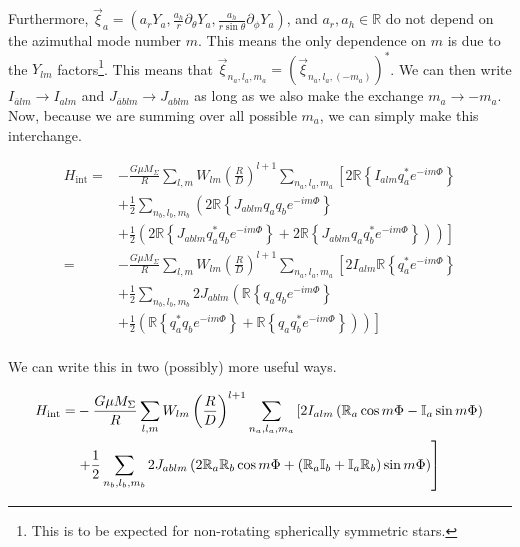 Furthermore, $\vec{\xi}_a = \left( a_r Y_a, \frac{a_h}{r} \partial_{\theta} Y_a, \frac{a_h}{r \sin\theta} \partial_{\phi} Y_a \right)$, and $a_r, a_h \in \mathbb{R}$ do not depend on the azimuthal mode number $m$. This means the only dependence on $m$ is due to the $Y_{lm}$ factors\footnote{This is to be expected for non-rotating spherically symmetric stars.}. This means that $\vec{\xi}_{n_a,l_a,m_a} = \left(\vec{\xi}_{n_a,l_a,(-m_a)}\right)^\ast$. We can then write $I_{\bar{a}lm} \rightarrow I_{alm}$ and $J_{\bar{a}blm} \rightarrow J_{ablm}$ as long as we also make the exchange $m_a \rightarrow -m_a$. Now, because we are summing over all possible $m_a$, we can simply make this interchange.

\begin{subequations}
\begin{align}
H_{\mathrm{int}}  = & - \frac{G \mu M_{\Sigma}}{R} \sum_{l,m} W_{lm} \left(\frac{R}{D}\right)^{l+1} \sum_{n_a, l_a, m_a} \left[ 2\mathbb{R}\left\{I_{alm}q_a^\ast e^{-i m \Phi}\right\} \right. \\
                    & \left. + \frac{1}{2}\sum_{n_b,l_b,m_b} \left( 2\mathbb{R}\left\{J_{ablm}q_a q_b e^{-i m \Phi}\right\} \right. \right.\\
                    & \left. \left. + \frac{1}{2}\left( 2\mathbb{R}\left\{J_{ablm}q_{a}^\ast q_b e^{-i m \Phi}\right\} + 2\mathbb{R}\left\{J_{ablm}q_{a} q_{b}^\ast e^{-i m \Phi}\right\} \right) \right) \right] \\ 
                  = & - \frac{G \mu M_{\Sigma}}{R} \sum_{l,m} W_{lm} \left(\frac{R}{D}\right)^{l+1} \sum_{n_a, l_a, m_a} \left[ 2I_{alm}\mathbb{R}\left\{q_a^\ast e^{-i m \Phi}\right\} \right. \\
                    & \left. + \frac{1}{2}\sum_{n_b,l_b,m_b} 2J_{ablm}\left( \mathbb{R}\left\{q_a q_b e^{-i m \Phi}\right\} \right. \right.\\
                    & \left. \left. + \frac{1}{2}\left( \mathbb{R}\left\{q_{a}^\ast q_b e^{-i m \Phi}\right\} + \mathbb{R}\left\{q_{a} q_{b}^\ast e^{-i m \Phi}\right\} \right) \right) \right] \\
\end{align}
\end{subequations}

We can write this in two (possibly) more useful ways.

\begin{subequations}
\begin{align}
H_{\mathrm{int}}  = & - \frac{G \mu M_{\Sigma}}{R} \sum_{l,m} W_{lm} \left(\frac{R}{D}\right)^{l+1} \sum_{n_a, l_a, m_a} \left[ 2I_{alm}\left(\mathbb{R}_{a}\cos m\Phi - \mathbb{I}_{a}\sin m\Phi\right) \right. \\
                    & \left. + \frac{1}{2}\sum_{n_b,l_b,m_b} 2J_{ablm}\left( 2\mathbb{R}_{a}\mathbb{R}_{b}\cos m\Phi + \left(\mathbb{R}_{a}\mathbb{I}_{b} + \mathbb{I}_{a}\mathbb{R}_{b}\right)\sin m\Phi \right) \right]\\
\end{align}
\end{subequations}

